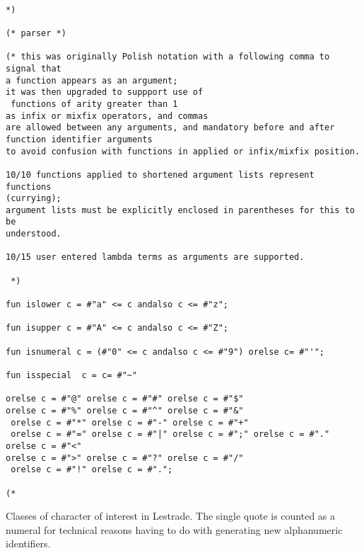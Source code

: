 \documentclass{article}
\begin{document}
\begin{verbatim}

*)

(* parser *)

(* this was originally Polish notation with a following comma to signal that
a function appears as an argument; 
it was then upgraded to suppport use of
 functions of arity greater than 1 
as infix or mixfix operators, and commas 
are allowed between any arguments, and mandatory before and after 
function identifier arguments 
to avoid confusion with functions in applied or infix/mixfix position.

10/10 functions applied to shortened argument lists represent functions 
(currying);
argument lists must be explicitly enclosed in parentheses for this to be
understood.

10/15 user entered lambda terms as arguments are supported.

 *)

fun islower c = #"a" <= c andalso c <= #"z";

fun isupper c = #"A" <= c andalso c <= #"Z";

fun isnumeral c = (#"0" <= c andalso c <= #"9") orelse c= #"'";

fun isspecial  c = c= #"~" 

orelse c = #"@" orelse c = #"#" orelse c = #"$" 
orelse c = #"%" orelse c = #"^" orelse c = #"&"
 orelse c = #"*" orelse c = #"-" orelse c = #"+"
 orelse c = #"=" orelse c = #"|" orelse c = #";" orelse c = #"." orelse c = #"<" 
orelse c = #">" orelse c = #"?" orelse c = #"/"
 orelse c = #"!" orelse c = #".";

(*

\end{verbatim}

Classes of character of interest in Lestrade.  The single quote is counted as a numeral for technical reasons having to do with generating new
alphanumeric identifiers.
\end{document}

